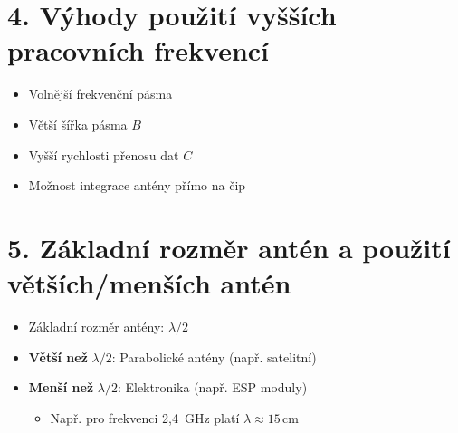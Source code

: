 \documentclass[a4paper,12pt]{article}
\begin{document}
\section*{4. Výhody použití vyšších pracovních frekvencí}

\begin{itemize}
    \item Volnější frekvenční pásma
    \item Větší šířka pásma \( B \)
    \item Vyšší rychlosti přenosu dat \( C \)
    \item Možnost integrace antény přímo na čip
\end{itemize}

\section*{5. Základní rozměr antén a použití větších/menších antén}

\begin{itemize}
    \item Základní rozměr antény: \( \lambda / 2 \)
    \item \textbf{Větší než} \( \lambda / 2 \): Parabolické antény (např. satelitní)
    \item \textbf{Menší než} \( \lambda / 2 \): Elektronika (např. ESP moduly)
    
    \begin{itemize}
        \item Např. pro frekvenci 2{,}4~GHz platí \( \lambda \approx 15 \,\text{cm} \)
    \end{itemize}
\end{itemize}
\end{document}
